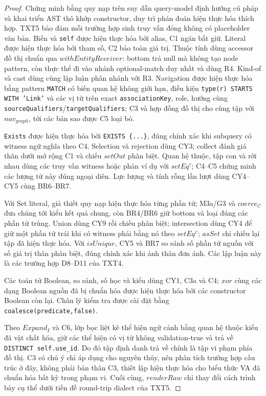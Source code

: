 \documentclass[11pt,a4paper]{article}
\theoremstyle{definition}
\begin{document}
\begin{proof}
Chứng minh bằng quy nạp trên suy dẫn query-model định hướng cú pháp và khai
triển AST thô khớp constructor, duy trì phán đoán hiện thực hóa thích hợp. TXT5
bảo đảm mỗi trường hợp sinh truy vấn đóng không có placeholder văn bản. Biến và
\texttt{self} được hiện thực hóa bởi alias, C1 ngăn bắt giữ. Literal được hiện
thực hóa bởi tham số, C2 bảo toàn giá trị. Thuộc tính dùng accessor đồ thị chuẩn
qua $withEntityReceiver$: bottom trả null mà không tạo node pattern, còn thực
thể đi vào nhánh optional-match duy nhất và dùng R4. Kind-of và cast dùng cùng
lập luận phân nhánh với R3. Navigation được hiện thực hóa bằng pattern
\texttt{MATCH} có biến quan hệ không giới hạn, điều kiện
\texttt{type(r) STARTS WITH 'Link'} và các vị từ trên
exact \texttt{associationKey}, role, hướng cùng
\texttt{sourceQualifiers}/\texttt{targetQualifiers}; C3 và hợp đồng đồ
thị cho cùng tập với $nav_{graph}$, tới các bản sao được C5 loại bỏ.

\texttt{Exists} được hiện thực hóa bởi \texttt{EXISTS \{...\}}, đúng chính xác
khi subquery có witness ngữ nghĩa theo C4. Selection và rejection dùng CY3;
collect đánh giá thân dưới mở rộng C1 và chiếu $setOut$ phân biệt. Quan hệ thuộc,
tập con và rời nhau dùng các truy vấn witness hoặc phản ví dụ với
$setEq^\tau$; C4--C5 chứng minh các lượng từ này đúng ngoại diên. Lực lượng và
tính rỗng lần lượt dùng CY4--CY5 cùng BR6--BR7.

Với Set literal, giả thiết quy nạp hiện thực hóa từng phần tử; M3a/G3 và
$coerce_C$ đưa chúng tới kiểu kết quả chung, còn BR4/BR6 giữ bottom và loại
đúng các phần tử trùng. Union dùng CY9 rồi chiếu phân biệt; intersection dùng
CY4 để giữ một phần tử trái khi có witness phải bằng nó theo
$setEq^\upsilon$; $asSet$ chỉ chiếu lại tập đã hiện thực hóa. Với $isUnique$,
CY5 và BR7 so sánh số phần tử nguồn với số giá trị thân phân biệt, đúng chính
xác khi ảnh thân đơn ánh. Các lập luận này là các trường hợp D8--D11 của TXT4.

Các toán tử Boolean, so sánh, số học và kiểu dùng CY1, C3a và C4; $xor$ cùng
các dạng Boolean nguồn đã bị chuẩn hóa được hiện thực hóa bởi các constructor
Boolean còn lại. Chân lý kiểm tra được cài đặt bằng
\texttt{coalesce(predicate,false)}.

Theo $Expand_I$ và C6, lớp bọc liệt kê thể hiện ngữ cảnh bằng quan hệ thuộc kiểu
đã vật chất hóa, giữ các thể hiện có vị từ không validation-true và trả về
\texttt{DISTINCT self.use\_id}. Do đó tập định danh trả về chính là tập vi phạm
phía đồ thị. C3 có chủ ý chỉ áp dụng cho nguyên thủy, nên phân tích trường hợp
cấu trúc ở đây, không phải bản thân C3, thiết lập hiện thực hóa cho biểu thức VA
đã chuẩn hóa bất kỳ trong phạm vi. Cuối cùng, $renderRaw$ chỉ thay đổi cách
trình bày cụ thể dưới tiền đề round-trip dialect của TXT5.
\end{proof}
\end{document}
